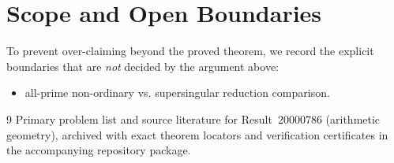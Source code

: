 \documentclass[10pt,reqno]{amsart}
\theoremstyle{definition}
\begin{document}
\section{Scope and Open Boundaries}

To prevent over-claiming beyond the proved theorem, we record the explicit boundaries that are \emph{not} decided by the argument above:
\begin{itemize}
  \item all-prime non-ordinary vs. supersingular reduction comparison.
\end{itemize}

\begin{thebibliography}{9}
Primary problem list and source literature for Result~20000786 (arithmetic geometry), archived with exact theorem locators and verification certificates in the accompanying repository package.
\end{thebibliography}
\end{document}
